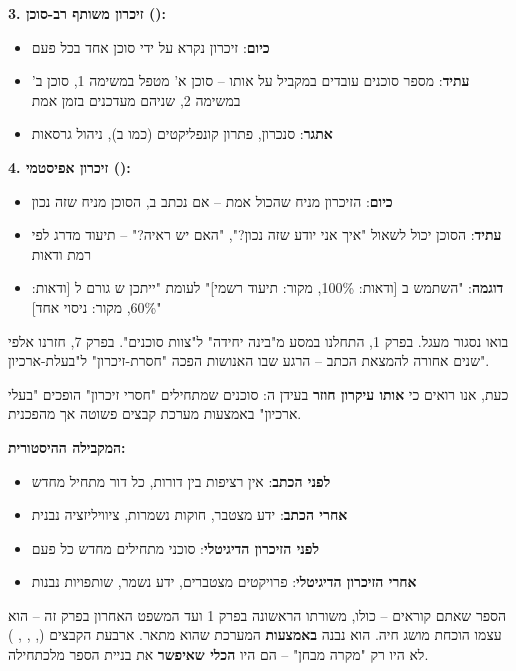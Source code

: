 \textbf{\num{3}. זיכרון משותף רב-סוכן ():}
\begin{itemize}
  \item \textbf{כיום}: זיכרון נקרא על ידי סוכן אחד בכל פעם
  \item \textbf{עתיד}: מספר סוכנים עובדים במקביל על אותו  – סוכן א' מטפל במשימה \num{1}, סוכן ב' במשימה \num{2}, שניהם מעדכנים בזמן אמת
  \item \textbf{אתגר}: סנכרון, פתרון קונפליקטים (כמו ב), ניהול גרסאות
\end{itemize}

\textbf{\num{4}. זיכרון אפיסטמי ():}
\begin{itemize}
  \item \textbf{כיום}: הזיכרון מניח שהכול אמת – אם נכתב ב, הסוכן מניח שזה נכון
  \item \textbf{עתיד}: הסוכן יכול לשאול "איך אני יודע שזה נכון?", "האם יש ראיה?" – תיעוד מדרג לפי רמת ודאות
  \item \textbf{דוגמה}: "השתמש ב [ודאות: \num{100}\%, מקור: תיעוד רשמי]" לעומת "ייתכן ש גורם ל [ודאות: \num{60}\%, מקור: ניסוי אחד]"
\end{itemize}


בואו נסגור מעגל. בפרק \num{1}, התחלנו במסע מ"בינה יחידה" ל"צוות סוכנים". בפרק \num{7}, חזרנו אלפי שנים אחורה להמצאת הכתב – הרגע שבו האנושות הפכה "חסרת-זיכרון" ל"בעלת-ארכיון".

כעת, אנו רואים כי \textbf{אותו עיקרון חוזר} בעידן ה: סוכנים שמתחילים "חסרי זיכרון" הופכים "בעלי ארכיון" באמצעות מערכת קבצים פשוטה אך מהפכנית.

\textbf{המקבילה ההיסטורית:}
\begin{itemize}
  \item \textbf{לפני הכתב}: אין רציפות בין דורות, כל דור מתחיל מחדש
  \item \textbf{אחרי הכתב}: ידע מצטבר, חוקות נשמרות, ציוויליזציה נבנית
  \item \textbf{לפני הזיכרון הדיגיטלי}: סוכני  מתחילים מחדש כל פעם
  \item \textbf{אחרי הזיכרון הדיגיטלי}: פרויקטים מצטברים, ידע נשמר, שותפויות נבנות
\end{itemize}

הספר שאתם קוראים – כולו, משורתו הראשונה בפרק \num{1} ועד המשפט האחרון בפרק זה – הוא עצמו הוכחת מושג חיה. הוא נבנה \textbf{באמצעות} המערכת שהוא מתאר. ארבעת הקבצים (, , , ) לא היו רק "מקרה מבחן" – הם היו \textbf{הכלי שאיפשר} את בניית הספר מלכתחילה.

